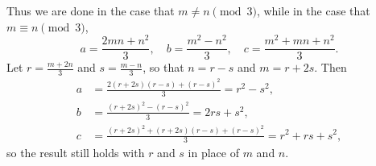 \begin{enumerate}
\begin{equation*}
\end{equation*}
Thus we are done in the case that $m\neq n\pmod{3}$, while in the case that $m\equiv n\pmod{3}$,
\begin{equation*}
a = \frac{2mn + n^2}{3},\quad b = \frac{m^2 - n^2}{3},\quad c = \frac{m^2 + mn + n^2}{3}.
\end{equation*}
Let $r = \frac{m + 2n}{3}$ and $s = \frac{m - n}{3}$, so that $n = r - s$ and $m = r + 2s$. Then
\begin{align*}
a &= \frac{2(r + 2s)(r - s) + (r - s)^2}{3} = r^2 - s^2, \\
b &= \frac{(r + 2s)^2 - (r - s)^2}{3} = 2rs + s^2, \\
c &= \frac{(r + 2s)^2 + (r + 2s)(r - s) + (r - s)^2}{3} = r^2 + rs + s^2,
\end{align*}
so the result still holds with $r$ and $s$ in place of $m$ and $n$.
\end{enumerate}